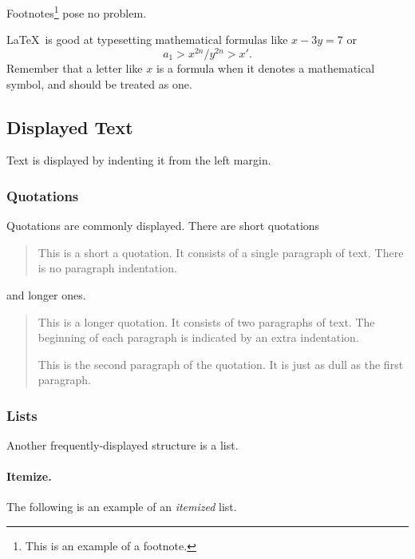 Footnotes\footnote{This is an example of a footnote.}
pose no problem.

\LaTeX\ is good at typesetting mathematical formulas like
       $ x-3y = 7 $
or
       $$ a_{1} > x^{2n} / y^{2n} > x'. $$
Remember that a letter like
       $x$        %
is a formula when it denotes a mathematical symbol, and should
be treated as one.

\subsection{Displayed Text}

Text is displayed by indenting it from the left margin.

\subsubsection{Quotations}

Quotations are commonly displayed.  There are short quotations
\begin{quote}
   This is a short a quotation.  It consists of a
   single paragraph of text.  There is no paragraph
   indentation.
\end{quote}
and longer ones.
\begin{quotation}
   This is a longer quotation.  It consists of two paragraphs
   of text.  The beginning of each paragraph is indicated
   by an extra indentation.

   This is the second paragraph of the quotation.  It is just
   as dull as the first paragraph.
\end{quotation}

\subsubsection{Lists}

Another frequently-displayed structure is a list.

\paragraph{Itemize.}
The following is an example of an {\em itemized} list.

\minusline %


